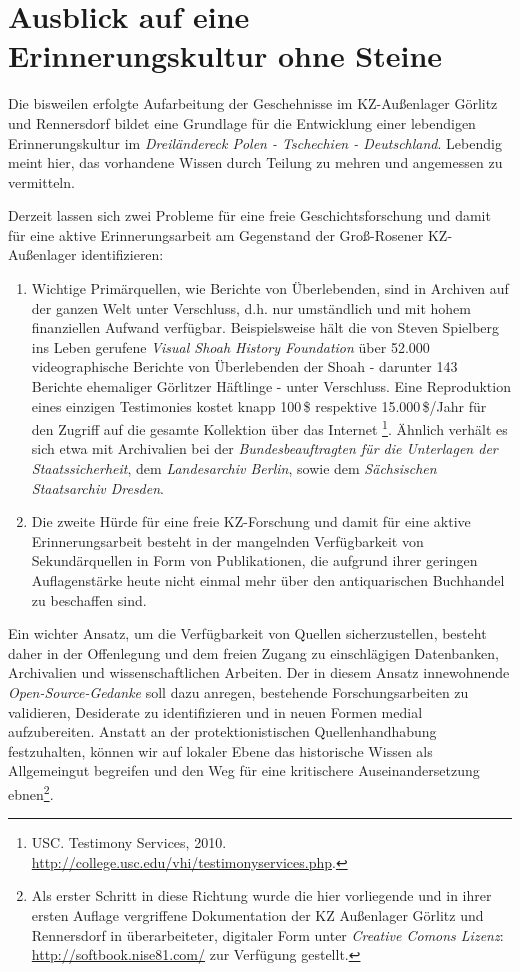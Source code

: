 \documentclass[a4paper,12pt,ngerman,
]{nisebook}
\begin{document}


\section{Ausblick auf eine Erinnerungskultur ohne Steine}
Die bisweilen erfolgte Aufarbeitung der Geschehnisse im KZ-Außenlager
Görlitz und Rennersdorf bildet eine Grundlage für die\emph{ }Entwicklung
einer lebendigen Erinnerungskultur im \emph{Dreiländereck Polen -
Tschechien - Deutschland}. Lebendig meint hier, das vorhandene Wissen
durch Teilung zu mehren und angemessen zu vermitteln. 

Derzeit lassen sich zwei Probleme für eine freie Geschichtsforschung
und damit für eine aktive Erinnerungsarbeit am Gegenstand der Groß-Rosener
KZ-Außenlager identifizieren: 
\begin{enumerate}
\item Wichtige Primärquellen, wie Berichte von Überlebenden, sind in Archiven
auf der ganzen Welt unter Verschluss, d.h. nur umständlich und mit
hohem finanziellen Aufwand verfügbar. Beispielsweise hält die von
Steven Spielberg ins Leben gerufene \emph{Visual Shoah History Foundation}
über 52.000 videographische Berichte von Überlebenden der Shoah -
da\-runter 143 Berichte ehemaliger Görlitzer Häftlinge - unter Verschluss.
Eine Reproduktion eines einzigen Testimonies kostet knapp 100\,\$ respektive
15.000\,\$/Jahr für den Zugriff auf die gesamte Kollektion über das
Internet \footnote{USC. Testimony Services, 2010. \url{http://college.usc.edu/vhi/testimonyservices.php}.}. Ähnlich verhält es sich etwa mit Archivalien
bei der \emph{Bundesbeauftragten für die Unterlagen der Staatssicherheit},
dem \emph{Landesarchiv Berlin}, sowie dem \emph{Sächsischen Staatsarchiv
Dresden}.
\item Die zweite Hürde für eine freie KZ-Forschung und damit für eine aktive
Erinnerungsarbeit besteht in der mangelnden Verfügbarkeit von Sekundärquellen
in Form von Publikationen, die aufgrund ihrer geringen Auflagenstärke
heute nicht einmal mehr über den antiquarischen Buchhandel zu beschaffen
sind. 
\end{enumerate}
Ein wichter Ansatz, um die Verfügbarkeit von Quellen sicherzustellen,
besteht daher in der Offenlegung und dem freien Zugang zu einschlägigen
Datenbanken, Archivalien und wissenschaftlichen Arbeiten. Der in diesem
Ansatz innewohnende \emph{Open-Source-Gedanke} soll dazu anregen,
bestehende Forschungsarbeiten zu validieren, Desiderate zu identifizieren
und in neuen Formen medial aufzubereiten. Anstatt an der protektionistischen
Quellenhandhabung festzuhalten, können wir auf lokaler Ebene das historische
Wissen als Allgemeingut begreifen und den Weg für eine kritischere
Auseinandersetzung ebnen\footnote{Als erster Schritt in diese Richtung wurde die hier vorliegende und in ihrer ersten Auflage vergriffene Dokumentation der KZ Außenlager Görlitz und Rennersdorf in überarbeiteter, digitaler Form unter \emph{Creative Comons Lizenz}: \url{http://softbook.nise81.com/} zur Verfügung gestellt.}. 
\end{document}
